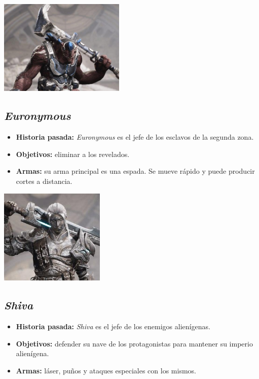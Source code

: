 \documentclass[11pt, twoside]{article}
\begin{document}
\begin{center}
\includegraphics[width=6cm]{./images/henkka.jpg}
\end{center}

\subsection{\textit{Euronymous}}
\begin{itemize}
\item \textbf{Historia pasada:} \textit{Euronymous} es el jefe de los esclavos de la segunda zona.
\item \textbf{Objetivos:} eliminar a los revelados.
\item \textbf{Armas:} su arma principal es una espada. Se mueve rápido y puede producir cortes a distancia. 
\end{itemize}

\begin{center}
\includegraphics[width=5cm]{./images/euronymous.jpg}
\end{center}

\subsection{\textit{Shiva}}
\begin{itemize}
\item \textbf{Historia pasada:} \textit{Shiva} es el jefe de los enemigos alienígenas.
\item \textbf{Objetivos:} defender su nave de los protagonistas para mantener su imperio alienígena.
\item \textbf{Armas:} láser, puños y ataques especiales con los mismos. 
\end{itemize}
\end{document}
